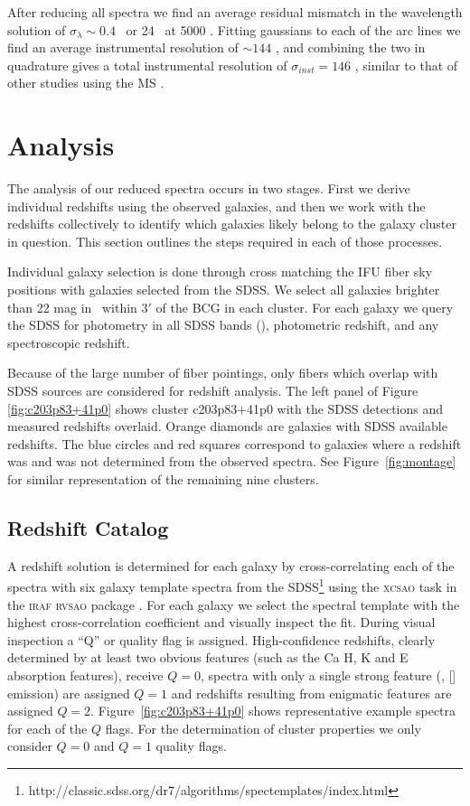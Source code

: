After reducing all spectra we find an average residual mismatch in the wavelength solution of $\sigma_\lambda \sim 0.4$ \AAA\ or 24 \kms\ at 5000 \AAA. Fitting gaussians to each of the arc lines we find an average instrumental resolution of $\sim144$ \kms, and combining the two in quadrature gives a total instrumental resolution of $\sigma_{inst} = 146$ \kms, similar to that of other studies using the MS .

\section{Analysis}\label{sec:analysis} 
The analysis of our reduced spectra occurs in two stages. First we derive individual redshifts using the observed galaxies, and then we work with the redshifts collectively to identify which galaxies likely belong to the galaxy cluster in question. This section outlines the steps required in each of those processes. 

Individual galaxy selection is done through cross matching the IFU fiber sky positions with galaxies selected from the SDSS. We select all galaxies brighter than 22 mag in \sdssg\ within $3'$ of the BCG in each cluster. For each galaxy we query the SDSS for photometry in all SDSS bands (\sdssu\sdssg\sdssr\sdssi\sdssz), photometric redshift, and any spectroscopic redshift. 

Because of the large number of fiber pointings, only fibers which overlap with SDSS sources are considered for redshift analysis. The left panel of Figure \ref{fig:c203p83+41p0} shows cluster c203p83+41p0 with the SDSS detections and measured redshifts overlaid. Orange diamonds are galaxies with SDSS available redshifts. The blue circles and red squares correspond to galaxies where a redshift was and was not determined from the observed spectra. See Figure~\ref{fig:montage} for similar representation of the remaining nine clusters.

\subsection{Redshift Catalog}\label{sec:redshift catalog} 
A redshift solution is determined for each galaxy by cross-correlating \citep{Tonry1979} each of the spectra with six galaxy template spectra from the SDSS\footnote{http://classic.sdss.org/dr7/algorithms/spectemplates/index.html} using the \textsc{xcsao} task in the \textsc{iraf} \textsc{rvsao} package \citep{Kurtz1992, Kurtz1998}. For each galaxy we select the spectral template with the highest cross-correlation coefficient and visually inspect the fit. During visual inspection a ``Q'' or quality flag is assigned. High-confidence redshifts, clearly determined by at least two obvious features (such as the Ca H, K and E absorption features), receive $Q=0$, spectra with only a single strong feature (\eg, \hbox{[]} emission) are assigned $Q=1$ and redshifts resulting from enigmatic features are assigned $Q=2$. Figure~\ref{fig:c203p83+41p0} shows representative example spectra for each of the $Q$ flags. For the determination of cluster properties we only consider $Q=0$ and $Q=1$ quality flags. 

